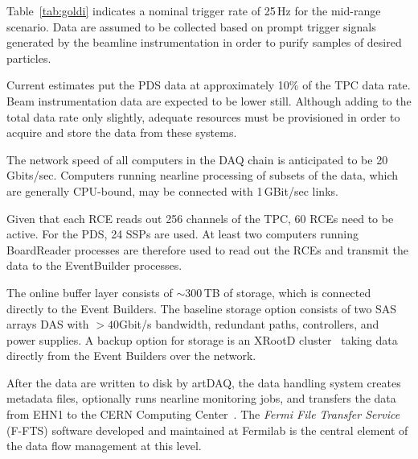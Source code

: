 
Table~\ref{tab:goldi} indicates a nominal trigger rate of 25\,Hz for
the mid-range scenario. 
 Data are assumed to be
collected based on prompt trigger signals generated by the beamline
instrumentation in order to purify samples of desired particles.

Current estimates put the PDS data at approximately 10\% 
of the TPC data rate.  Beam instrumentation data are expected to be lower still.
Although adding to the
total data rate only slightly, adequate resources must
be provisioned in order to acquire and store the data from these
systems.  

The network speed of all computers in the DAQ
chain is anticipated to be 20\,Gbits/sec. 
 Computers running nearline
processing of subsets of the data, which are generally CPU-bound, may
be connected with 1\,GBit/sec links.  


Given that each RCE reads out 256 channels of the TPC, 60 RCEs
need to be active.  For the PDS, 24 SSPs are used.  At least two computers 
running BoardReader processes are therefore used to read out
the RCEs and transmit the data to the EventBuilder processes.

The online buffer layer consists of $\sim$300\,TB of storage,
which is connected directly to the Event Builders.  The baseline
storage option consists of two SAS arrays DAS with $>40$Gbit/s bandwidth,
redundant paths, controllers, and power supplies.
A backup option for storage is an XRootD cluster~\cite{xrootd} taking
data directly from the Event Builders over the network.

After the data are written to disk by artDAQ, the data handling
system creates metadata files, optionally  runs nearline monitoring jobs, and
transfers the data from EHN1 to the CERN Computing Center~\cite{docdb1212}.
The \textit{Fermi File Transfer Service} (F-FTS) software 
developed and maintained at Fermilab is the central element
of the data flow management at this level.


